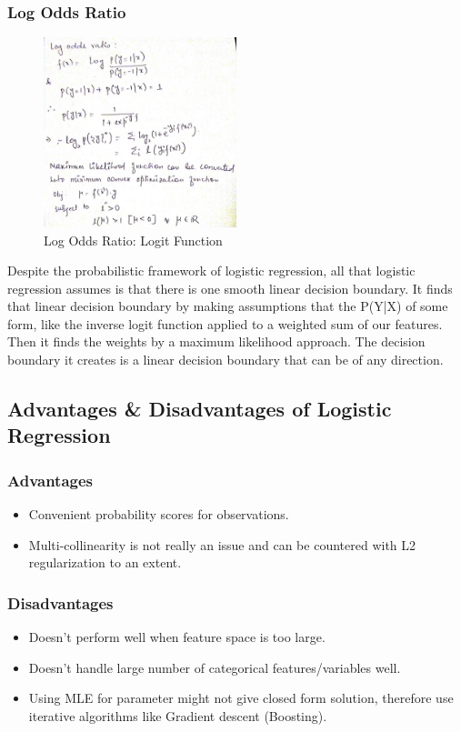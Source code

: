 \subsubsection{Log Odds Ratio}

\begin{figure}[H]
  \begin{center}
    \includegraphics[width=0.5\textwidth]{log_odds.png}
    \caption{
      Log Odds Ratio: Logit Function}
  \end{center}
\end{figure}


Despite the probabilistic framework of logistic regression, all that logistic regression assumes is that there is one smooth linear decision boundary. It finds that linear decision boundary by making assumptions that the P(Y|X) of some form, like the inverse logit function applied to a weighted sum of our features. Then it finds the weights by a maximum likelihood approach. The decision boundary it creates is a linear decision boundary that can be of any direction.

\subsection{Advantages \& Disadvantages of Logistic Regression}
\subsubsection{Advantages}
\begin{itemize}
    \item Convenient probability scores for observations.
    \item Multi-collinearity is not really an issue and can be countered with L2 regularization to an extent.
\end{itemize}

\subsubsection{Disadvantages}
\begin{itemize}
    \item Doesn't perform well when feature space is too large.
    \item Doesn't handle large number of categorical features/variables well.
    \item Using MLE for parameter might not give closed form solution, therefore use iterative algorithms like Gradient descent (Boosting).
\end{itemize}

